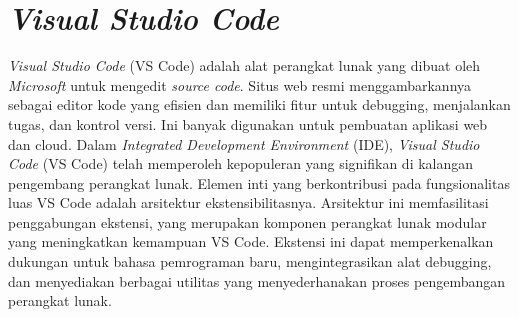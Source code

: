 \section{\textit{Visual Studio Code}}

\emph{Visual Studio Code} (VS Code) adalah alat perangkat lunak yang dibuat oleh \emph{Microsoft} untuk mengedit \emph{source code}. Situs web resmi menggambarkannya sebagai editor kode yang efisien dan memiliki fitur untuk debugging, menjalankan tugas, dan kontrol versi. Ini banyak digunakan untuk pembuatan aplikasi web dan cloud. 
\singlespacing{}
Dalam \emph{Integrated Development Environment} (IDE), \emph{Visual Studio Code} (VS Code) telah memperoleh kepopuleran yang signifikan di kalangan pengembang perangkat lunak. Elemen inti yang berkontribusi pada fungsionalitas luas VS Code adalah arsitektur ekstensibilitasnya. Arsitektur ini memfasilitasi penggabungan ekstensi, yang merupakan komponen perangkat lunak modular yang meningkatkan kemampuan VS Code. Ekstensi ini dapat memperkenalkan dukungan untuk bahasa pemrograman baru, mengintegrasikan alat debugging, dan menyediakan berbagai utilitas yang menyederhanakan proses pengembangan perangkat lunak.\@ \citep{microsoft2025visual}
